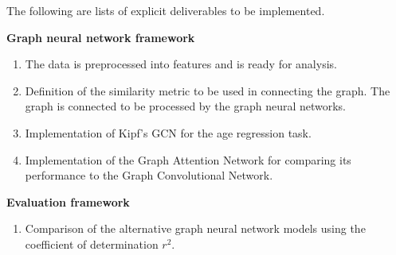\documentclass[12pt,a4paper,twoside]{article}
\begin{document}

The following are lists of explicit deliverables to be implemented.

\textbf{Graph neural network framework}
\begin{enumerate}[label=G\arabic*.]
  \item The data is preprocessed into features and is ready for analysis. %
  \item Definition of the similarity metric to be used in connecting the graph. The graph is connected to be processed by the graph neural networks.
  \item Implementation of Kipf's GCN \cite{kipf2017semi} for the age regression task.
  \item Implementation of the Graph Attention Network for comparing its performance to the Graph Convolutional Network.
\end{enumerate}

\textbf{Evaluation framework}

\begin{enumerate}[label=E\arabic*.]
  \item  Comparison of the alternative graph neural network models using the coefficient of determination $r^2$.
\end{enumerate}
\end{document}
